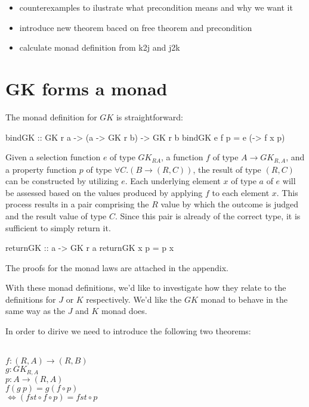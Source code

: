 \documentclass[runningheads]{llncs}
\providecommand{\tightlist}{%
  \setlength{\itemsep}{0pt}\setlength{\parskip}{0pt}}
\begin{document}
\begin{itemize}
\tightlist
\item
  counterexamples to ilustrate what precondition means and why we want
  it
\item
  introduce new theorem baced on free theorem and precondition
\item
  calculate monad definition from k2j and j2k
\end{itemize}

\section{GK forms a monad}\label{gk-forms-a-monad}

The monad definition for \(GK\) is straightforward:

\begin{code}
bindGK :: GK r a -> (a -> GK r b) -> GK r b
bindGK e f p = e (\x -> f x p)
\end{code}

Given a selection function \(e\) of type \(GK_{R A}\), a function \(f\)
of type \(A \rightarrow GK_{R,A}\), and a property function \(p\) of
type \(\forall C. (B \rightarrow (R,C))\), the result of type \((R,C)\)
can be constructed by utilizing \(e\). Each underlying element \(x\) of
type \(a\) of \(e\) will be assessed based on the values produced by
applying \(f\) to each element \(x\). This process results in a pair
comprising the \(R\) value by which the outcome is judged and the result
value of type \(C\). Since this pair is already of the correct type, it
is sufficient to simply return it.

\begin{code}
returnGK :: a -> GK r a
returnGK x p = p x
\end{code}

The proofs for the monad laws are attached in the appendix.

With these monad definitions, we'd like to investigate how they relate
to the definitions for \(J\) or \(K\) respectively. We'd like the \(GK\)
monad to behave in the same way as the \(J\) and \(K\) monad does.

In order to dirive we need to introduce the following two theorems:

\begin{theorem}[Theorem 1]\\
$f : (R,A) \rightarrow (R,B)$\\
$g : GK_{R,A}$\\
$p : A \rightarrow (R,A)$\\
$f (g\:p) = g (f \circ p)$\\
$\iff (fst \circ f \circ p) = fst \circ p$\\
\end{theorem}
\end{document}
